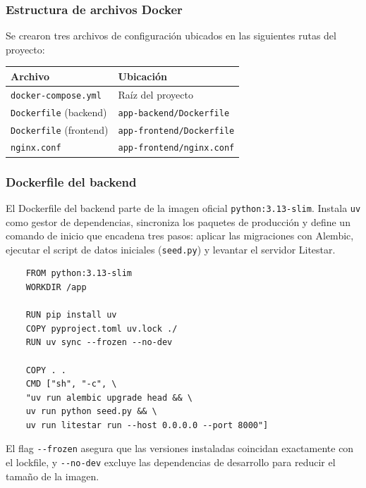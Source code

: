 \subsubsection*{Estructura de archivos Docker}

Se crearon tres archivos de configuración ubicados en las siguientes rutas del proyecto:

\begin{center}
	\begin{tabular}{ll}
		\hline
		\textbf{Archivo} & \textbf{Ubicación} \\
		\hline
		\texttt{docker-compose.yml}       & Raíz del proyecto \\
		\texttt{Dockerfile} (backend)     & \texttt{app-backend/Dockerfile} \\
		\texttt{Dockerfile} (frontend)    & \texttt{app-frontend/Dockerfile} \\
		\texttt{nginx.conf}               & \texttt{app-frontend/nginx.conf} \\
		\hline
	\end{tabular}
\end{center}

\subsubsection*{Dockerfile del backend}

El Dockerfile del backend parte de la imagen oficial \texttt{python:3.13-slim}.
Instala \texttt{uv} como gestor de dependencias, sincroniza los paquetes de producción
y define un comando de inicio que encadena tres pasos: aplicar las migraciones con Alembic,
ejecutar el script de datos iniciales (\texttt{seed.py}) y levantar el servidor Litestar.

\begin{lstlisting}
	FROM python:3.13-slim
	WORKDIR /app
	
	RUN pip install uv
	COPY pyproject.toml uv.lock ./
	RUN uv sync --frozen --no-dev
	
	COPY . .
	CMD ["sh", "-c", \
	"uv run alembic upgrade head && \
	uv run python seed.py && \
	uv run litestar run --host 0.0.0.0 --port 8000"]
\end{lstlisting}

El flag \texttt{-{}-frozen} asegura que las versiones instaladas coincidan exactamente con el
lockfile, y \texttt{-{}-no-dev} excluye las dependencias de desarrollo para reducir el tamaño
de la imagen.

